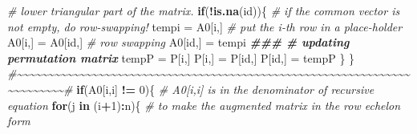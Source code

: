 \documentclass[
]{book}
\newenvironment{Shaded}{\begin{snugshade}}{\end{snugshade}}
\newcommand{\CommentTok}[1]{\textcolor[rgb]{0.56,0.35,0.01}{\textit{#1}}}
\newcommand{\ControlFlowTok}[1]{\textcolor[rgb]{0.13,0.29,0.53}{\textbf{#1}}}
\newcommand{\DecValTok}[1]{\textcolor[rgb]{0.00,0.00,0.81}{#1}}
\newcommand{\DocumentationTok}[1]{\textcolor[rgb]{0.56,0.35,0.01}{\textbf{\textit{#1}}}}
\newcommand{\FunctionTok}[1]{\textcolor[rgb]{0.13,0.29,0.53}{\textbf{#1}}}
\newcommand{\NormalTok}[1]{#1}
\newcommand{\OtherTok}[1]{\textcolor[rgb]{0.56,0.35,0.01}{#1}}
\newcommand{\SpecialCharTok}[1]{\textcolor[rgb]{0.81,0.36,0.00}{\textbf{#1}}}
\begin{document}
\begin{Shaded}
\begin{Highlighting}[]
                                                \CommentTok{\# lower triangular part of the matrix.}
              \ControlFlowTok{if}\NormalTok{(}\SpecialCharTok{!}\FunctionTok{is.na}\NormalTok{(id))\{     }\CommentTok{\# if the common vector is not empty, do row{-}swapping!}
\NormalTok{              tempi }\OtherTok{=}\NormalTok{ A0[i,]                    }\CommentTok{\# put the i{-}th row in a place{-}holder}
\NormalTok{              A0[i,] }\OtherTok{=}\NormalTok{ A0[id,]                  }\CommentTok{\# row swapping}
\NormalTok{              A0[id,] }\OtherTok{=}\NormalTok{ tempi    }
              \DocumentationTok{\#\#\#                               \# updating permutation matrix}
\NormalTok{              tempP }\OtherTok{=}\NormalTok{ P[i,]}
\NormalTok{              P[i,] }\OtherTok{=}\NormalTok{ P[id,]                    }
\NormalTok{              P[id,] }\OtherTok{=}\NormalTok{ tempP }
\NormalTok{            \}}
\NormalTok{           \}}
        \CommentTok{\#\textasciitilde{}\textasciitilde{}\textasciitilde{}\textasciitilde{}\textasciitilde{}\textasciitilde{}\textasciitilde{}\textasciitilde{}\textasciitilde{}\textasciitilde{}\textasciitilde{}\textasciitilde{}\textasciitilde{}\textasciitilde{}\textasciitilde{}\textasciitilde{}\textasciitilde{}\textasciitilde{}\textasciitilde{}\textasciitilde{}\textasciitilde{}\textasciitilde{}\textasciitilde{}\textasciitilde{}\textasciitilde{}\textasciitilde{}\textasciitilde{}\textasciitilde{}\textasciitilde{}\textasciitilde{}\textasciitilde{}\textasciitilde{}\textasciitilde{}\textasciitilde{}\textasciitilde{}\textasciitilde{}\textasciitilde{}\textasciitilde{}\textasciitilde{}\textasciitilde{}\textasciitilde{}\textasciitilde{}\textasciitilde{}\textasciitilde{}\textasciitilde{}\textasciitilde{}\textasciitilde{}\textasciitilde{}\textasciitilde{}\textasciitilde{}\textasciitilde{}\textasciitilde{}\textasciitilde{}\textasciitilde{}\textasciitilde{}\textasciitilde{}\textasciitilde{}\textasciitilde{}\textasciitilde{}\textasciitilde{}\textasciitilde{}\textasciitilde{}\textasciitilde{}\textasciitilde{}\textasciitilde{}\textasciitilde{}\textasciitilde{}\textasciitilde{}\textasciitilde{}\textasciitilde{}\textasciitilde{}\textasciitilde{}\#}
        \ControlFlowTok{if}\NormalTok{(A0[i,i] }\SpecialCharTok{!=} \DecValTok{0}\NormalTok{)\{     }\CommentTok{\# A0[i,i] is in the denominator of recursive equation}
        \ControlFlowTok{for}\NormalTok{(j }\ControlFlowTok{in}\NormalTok{ (i}\SpecialCharTok{+}\DecValTok{1}\NormalTok{)}\SpecialCharTok{:}\NormalTok{n)\{    }\CommentTok{\# to make the augmented matrix in the row echelon form}

\end{Highlighting}
\end{Shaded}
\end{document}

